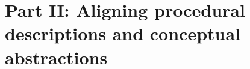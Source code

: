 \documentclass[10pt,letterpaper]{article}
\begin{document}







\section{Part II: Aligning procedural descriptions and conceptual abstractions}\label{sec-part-ii}
\end{document}
